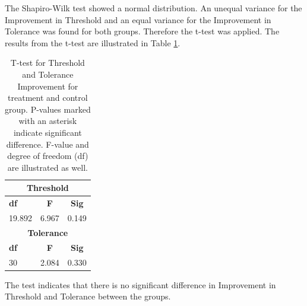 The Shapiro-Wilk test showed a normal distribution. An unequal variance for the Improvement in Threshold and an equal variance for the Improvement in Tolerance was found for both groups. Therefore the t-test was applied. The results from the t-test are illustrated in Table \ref{table:TTEST}. 

\begin{table}[ht]
\caption{T-test for Threshold and Tolerance Improvement for treatment and control group. P-values marked with an asterisk indicate significant difference. F-value and degree of
freedom (df) are illustrated as well.}
\centering
\begin{tabular}{l c c} 
\toprule
\multicolumn{3}{c}{\textbf{Threshold}} \\
\midrule  
\textbf{df} & \textbf{F} & \textbf{Sig} \\ [0.5ex] %
19.892 & 6.967 & 0.149    \\
\toprule
\multicolumn{3}{c}{\textbf{Tolerance}} \\
\midrule 
\textbf{df} & \textbf{F} & \textbf{Sig} \\ [0.5ex] %
30 & 2.084 & 0.330 \\
\hline
\end{tabular}
\label{table:TTEST}
\end{table}

\noindent
The test indicates that there is no significant difference in Improvement in Threshold and Tolerance between the groups.
